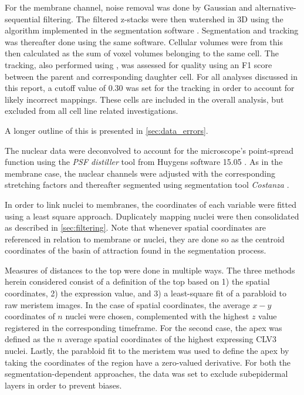 For the membrane channel, noise removal was done by Gaussian and alternative-sequential
filtering. The filtered z-stacks were then watershed in 3D using the
algorithm implemented in the segmentation software \MA. Segmentation and
tracking was thereafter done using the same software. Cellular volumes were from
this then calculated as the sum of voxel volumes belonging to the same cell.
The tracking, also performed using \MA, was assessed for quality using an F1
score between the parent and corresponding daughter cell. For all analyses
discussed in this report, a cutoff value of 0.30 was set for the tracking in
order to account for likely incorrect mappings. These cells are included in the
overall analysis, but excluded from all cell line related investigations.

A longer outline of this is presented
in \cref{sec:data_errors}. 

The nuclear data were deconvolved to account for the microscope's point-spread
function using the \textit{PSF distiller} tool from Huygens software 15.05
\CITE. As in the membrane case, the nuclear channels were adjusted with the
corresponding stretching factors and thereafter segmented using segmentation
tool \textit{Costanza} \CITE. 

In order to link nuclei to membranes, the coordinates of each variable were
fitted using a least square approach. Duplicately mapping nuclei were then
consolidated as described in \cref{sec:filtering}. Note that whenever spatial
coordinates are referenced in relation to membrane or nuclei, they are done so
as the centroid coordinates of the basin of attraction found in the segmentation
process.

Measures of distances to the top were done in multiple ways. The three methods
herein considered consist of a definition of the top based on 1) the spatial
coordinates, 2) the expression value, and 3) a least-square fit of a parabloid to
raw meristem images. In the case of spatial coordinates, the average $x-y$
coordinates of $n$ nuclei were chosen, complemented with the highest $z$ value
registered in the corresponding timeframe. For the second case, the apex was
defined as the $n$ average spatial coordinates of the highest expressing CLV3
nuclei. Lastly, the parabloid fit to the meristem was used to define the apex by
taking the coordinates of the region have a zero-valued derivative. For both the
segmentation-dependent approaches, the data was set to exclude subepidermal
layers in order to prevent biases.

